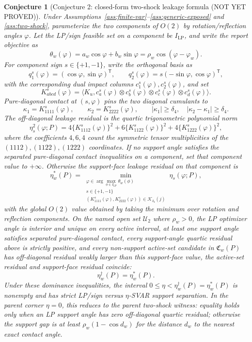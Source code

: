 \documentclass[11pt]{article}
\newcommand{\transpose}{\mathsf{T}}
\theoremstyle{definition}
\theoremstyle{plain}
\newtheorem{conjecture}{Conjecture}
\theoremstyle{remark}
\begin{document}
\begin{conjecture}[Conjecture 2: closed-form two-shock leakage formula (NOT YET PROVED)]\label{conj:two-shock-formula}
Under Assumptions~\ref{ass:finite-var}--\ref{ass:generic-exposed} and \ref{ass:two-shock}, parameterize the two components of \(O(2)\) by rotation/reflection angles \(\varphi\).  Let the LP/sign feasible set on a component be \(I_{\mathrm{LP}}\), and write the report objective as
\[
\theta_w(\varphi)=a_w\cos\varphi+b_w\sin\varphi=\rho_w\cos(\varphi-\varphi_w).
\]
For component sign \(s\in\{+1,-1\}\), write the orthogonal basis as
\[
q_1^s(\varphi)=(\cos\varphi,\sin\varphi)^\transpose,\qquad
q_2^s(\varphi)=s(-\sin\varphi,\cos\varphi)^\transpose,
\]
with the corresponding dual impact columns \(c_1^s(\varphi),c_2^s(\varphi)\), and set
\[
K^s_{abcd}(\varphi)=
\langle K_u,c_a^s(\varphi)\otimes c_b^s(\varphi)\otimes c_c^s(\varphi)\otimes c_d^s(\varphi)\rangle .
\]
Pure-diagonal contact at \((s,\varphi)\) pins the two diagonal cumulants to
\[
\kappa_1=K^s_{1111}(\varphi),\qquad \kappa_2=K^s_{2222}(\varphi),
\qquad
|\kappa_1|\ge\delta_4,\quad |\kappa_2-\kappa_1|\ge\delta_4.
\]
The off-diagonal leakage residual is the quartic trigonometric polynomial norm
\[
\eta_s^2(\varphi;P)
=4\{K^s_{1112}(\varphi)\}^2
+6\{K^s_{1122}(\varphi)\}^2
+4\{K^s_{1222}(\varphi)\}^2,
\]
where the coefficients \(4,6,4\) count the symmetric tensor multiplicities of the \((1112),(1122),(1222)\) coordinates.  If no support angle satisfies the separated pure-diagonal contact inequalities on a component, set that component value to \(+\infty\).  Otherwise the support-face leakage residual on that component is
\[
\eta_w^*(P)=
\min_{\substack{\varphi\in\arg\max_{\phi\in I_{\mathrm{LP}}}\theta_w(\phi)\\
s\in\{+1,-1\}\\
(K^s_{1111}(\varphi),K^s_{2222}(\varphi))\in\mathcal K_{\delta_4}(j)}}
\eta_s(\varphi;P),
\]
with the global \(O(2)\) value obtained by taking the minimum over rotation and reflection components.  On the named open set \(\mathcal U_2\) where \(\rho_w>0\), the LP optimizer angle is interior and unique on every active interval, at least one support angle satisfies separated pure-diagonal contact, every support-angle quartic residual above is strictly positive, and every non-support active-set candidate in \(\mathfrak C_w(P)\) has off-diagonal residual weakly larger than this support-face value, the active-set residual and support-face residual coincide:
\[
\eta_w^\dagger(P)=\eta_w^*(P).
\]
Under these dominance inequalities, the interval \(0\le\eta<\eta_w^\dagger(P)=\eta_w^*(P)\) is nonempty and has strict LP/sign versus \(\eta\)-SVAR support separation.  In the parent corner \(\eta=0\), this reduces to the parent two-shock witness: equality holds only when an LP support angle has zero off-diagonal quartic residual; otherwise the support gap is at least \(\rho_w(1-\cos d_w)\) for the distance \(d_w\) to the nearest exact contact angle.
\end{conjecture}
\end{document}
